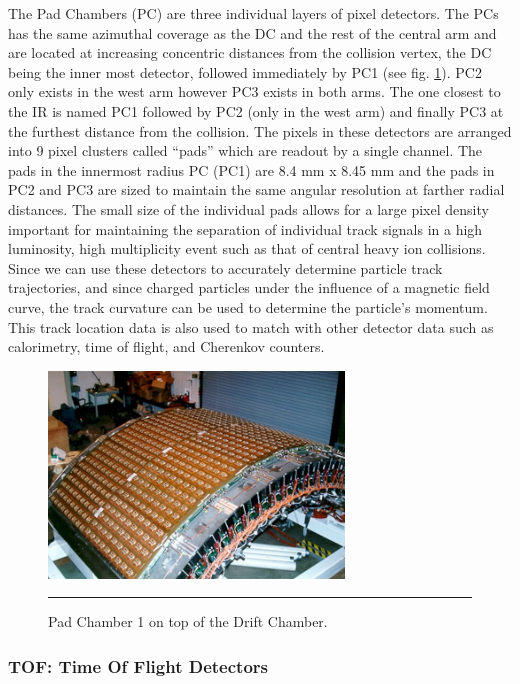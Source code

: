 The Pad Chambers\citep{PCfocus} (PC) are three individual layers of pixel detectors. The PCs has the same azimuthal coverage as the DC and the rest of the central arm and are located at increasing concentric distances from the collision vertex, the DC being the inner most detector, followed immediately by PC1 (see fig. \ref{fig:pcdiagram}). PC2 only exists in the west arm however PC3 exists in both arms. The one closest to the IR is named PC1 followed by PC2 (only in the west arm) and finally PC3 at the furthest distance from the collision. The pixels in these detectors are arranged into 9 pixel clusters called ``pads'' which are readout by a single channel. The pads in the innermost radius PC (PC1) are 8.4 mm x 8.45 mm and the pads in PC2 and PC3 are sized to maintain the same angular resolution at farther radial distances. The small size of the individual pads allows for a large pixel density important for maintaining the separation of individual track signals in a high luminosity, high multiplicity event such as that of central heavy ion collisions. Since we can use these detectors to accurately determine particle track trajectories, and since charged particles under the influence of a magnetic field curve, the track curvature can be used to determine the particle's momentum. This track location data is also used to match with other detector data such as calorimetry, time of flight, and Cherenkov counters.
\begin{figure}[htbp]
  \centering
    \includegraphics[width=0.7\textwidth]{Figures/PC1.jpg}
    \rule{35em}{0.5pt}
  \caption[Pad Chamber 1 on top of the Drift Chamber.]{Pad Chamber 1 on top of the Drift Chamber.}
  \label{fig:pcdiagram}
\end{figure}

\subsubsection{TOF: Time Of Flight Detectors}

